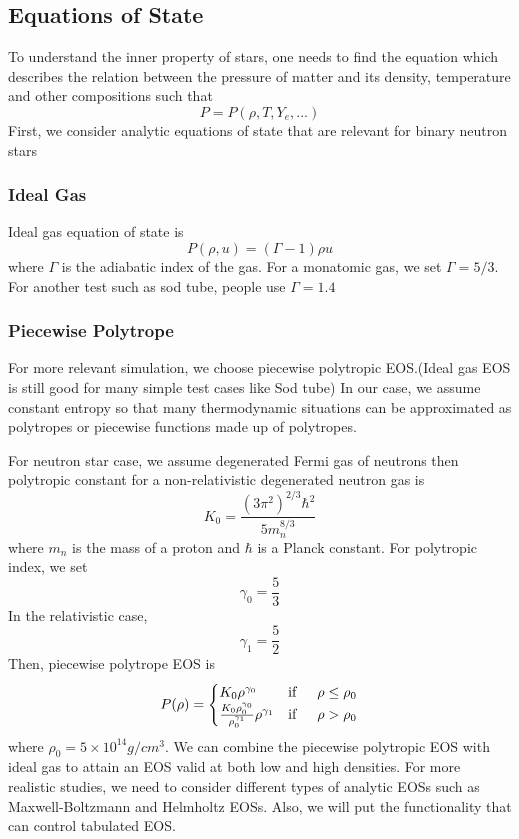 \documentclass{article}
\begin{document}
\subsection{Equations of State}
To understand the inner property of stars, one needs to find the equation which describes the relation between the pressure of matter and its density, temperature and other compositions such that
\begin{equation}
P = P(\rho, T, Y_e, ...)
\end{equation}
First, we consider analytic equations of state that are relevant for binary neutron stars
\subsubsection{Ideal Gas}
Ideal gas equation of state is
\begin{equation}
P(\rho,u) = (\Gamma - 1) \rho u
\end{equation}
where $\Gamma$ is the adiabatic index of the gas. For a monatomic gas, we set $\Gamma = 5/3$. For another test such as sod tube, people use $\Gamma = 1.4$
\subsubsection{Piecewise Polytrope}
For more relevant simulation, we choose piecewise polytropic EOS.(Ideal gas EOS is still good for many simple test cases like Sod tube) In our case, we assume constant entropy so that many thermodynamic situations can be approximated as polytropes or piecewise functions made up of polytropes.

For neutron star case, we assume degenerated Fermi gas of neutrons then polytropic constant for a non-relativistic degenerated neutron gas is
\begin{equation}
K_0 = \frac{(3 \pi^2)^{2/3} \hbar^2}{5 m_n^{8/3}}
\end{equation}
where $m_n$ is the mass of a proton and $\hbar$ is a Planck constant. For polytropic index, we set
\begin{equation}
\gamma_0 = \frac{5}{3}
\end{equation}
In the relativistic case,
\begin{equation}
\gamma_1 = \frac{5}{2}
\end{equation}
Then, piecewise polytrope EOS is
\begin{equation}
P(\rho) = \begin{cases}
K_0 \rho^{\gamma_0} & \text{if} \indent \rho \leq \rho_0 \\
\frac{K_0 \rho_0^{\gamma_0}}{\rho_0^{\gamma_1}} \rho^{\gamma_1} & \text{if} \indent \rho > \rho_0
\end{cases}
\end{equation}
where $\rho_0 = 5 \times 10^{14} g/cm^3$. We can combine the piecewise polytropic EOS with ideal gas to attain an EOS valid at both low and high densities. For more realistic studies, we need to consider different types of analytic EOSs such as Maxwell-Boltzmann and Helmholtz EOSs. Also, we will put the functionality that can control tabulated EOS.
\end{document}
